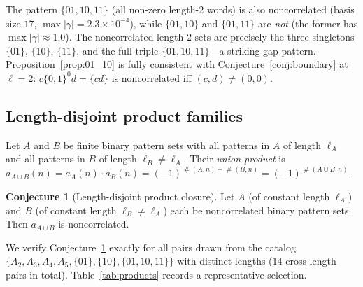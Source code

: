 \documentclass[11pt]{article}
\theoremstyle{definition}
\newtheorem{conjecture}[theorem]{Conjecture}
\DeclareMathOperator{\occ}{\#}
\begin{document}
The pattern $\{01,10,11\}$ (all non-zero length-$2$ words) is also
noncorrelated (basis size $17$, $\max|\gamma| = 2.3 \times 10^{-4}$),
while $\{01,10\}$ and $\{01,11\}$ are \emph{not} (the former has
$\max|\gamma| \approx 1.0$). The noncorrelated length-$2$ sets are
precisely the three singletons $\{01\}$, $\{10\}$, $\{11\}$, and the
full triple $\{01,10,11\}$---a striking gap pattern.
Proposition~\ref{prop:01_10} is fully consistent with
Conjecture~\ref{conj:boundary} at $\ell = 2$:
$c\{0,1\}^0 d = \{cd\}$ is noncorrelated iff $(c,d) \neq (0,0)$.

\subsection{Length-disjoint product families}

Let $A$ and $B$ be finite binary pattern sets with all patterns in $A$
of length $\ell_A$ and all patterns in $B$ of length $\ell_B \neq \ell_A$.
Their \emph{union product} is $a_{A \cup B}(n) = a_A(n) \cdot a_B(n) =
(-1)^{\occ(A,n)+\occ(B,n)} = (-1)^{\occ(A\cup B,n)}$.

\begin{conjecture}[Length-disjoint product closure]
\label{conj:product}
Let $A$ (of constant length $\ell_A$) and $B$ (of constant length
$\ell_B \neq \ell_A$) each be noncorrelated binary pattern sets.
Then $a_{A \cup B}$ is noncorrelated.
\end{conjecture}

We verify Conjecture~\ref{conj:product} exactly for all pairs drawn
from the catalog
$\{A_2, A_3, A_4, A_5, \{01\}, \{10\}, \{01,10,11\}\}$
with distinct lengths ($14$ cross-length pairs in total).
Table~\ref{tab:products} records a representative selection.
\end{document}
